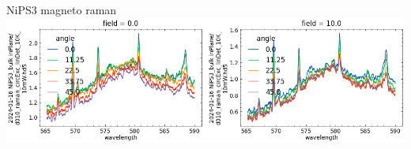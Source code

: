 \documentclass[
	10pt,
]{beamer}
\begin{document}
\begin{frame}{NiPS3 magneto raman}
	\includegraphics[width=\textwidth]{NiPS3 magnet raman.png}
\end{frame}
\end{document}
